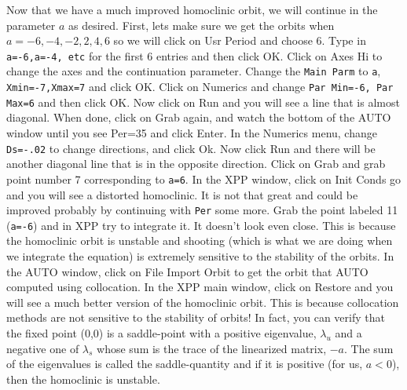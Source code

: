 \documentclass{article}
\begin{document}
Now that we have a much improved homoclinic orbit, we will continue in
the parameter $a$ as desired.  First, lets make sure we get the orbits
when $a=-6,-4,-2,2,4,6$ so we will click on Usr Period and choose
6. Type in {\tt a=-6,a=-4, etc} for the first 6 entries and then click OK.
Click on Axes Hi to change the axes and the continuation
parameter. Change the {\tt Main Parm} to {\tt a}, {\tt Xmin=-7,Xmax=7}
and click OK. Click on Numerics and change {\tt Par Min=-6, Par Max=6}
and then click OK. Now click on Run and you will see a line that is
almost diagonal.  When done, click on Grab again, and watch the bottom
of the AUTO window until you see Per=35 and click Enter. In the
Numerics menu, change {\tt Ds=-.02} to change directions, and click
Ok. Now click Run and there will be another diagonal line that is in
the opposite direction.  Click on Grab and grab point number 7
corresponding to {\tt a=6}. In the XPP window, click on Init Conds go
and you will see a distorted homoclinic. It is not that great and
could be improved probably by continuing with {\tt Per} some
more. Grab the point labeled  11 ({\tt a=-6}) and in XPP try to
integrate it. It doesn't look even close. This is because the
homoclinic orbit is unstable and shooting (which is what we are doing
when we integrate the equation) is extremely sensitive to the
stability of the orbits. In the AUTO window, click on File Import
Orbit to get the orbit that AUTO computed using collocation. In the
XPP main window, click on Restore and you will see a much better
version of the homoclinic orbit. This is because collocation methods
are not sensitive to the stability of orbits! In fact, you can verify
that the fixed point (0,0) is a saddle-point with a positive
eigenvalue, $\lambda_u$ and a negative one of $\lambda_s$ whose sum is
the trace of the linearized matrix, $-a$. The sum of the eigenvalues
is called the saddle-quantity and if it is positive (for us, $a<0$), 
then the homoclinic is unstable.    
\end{document}
